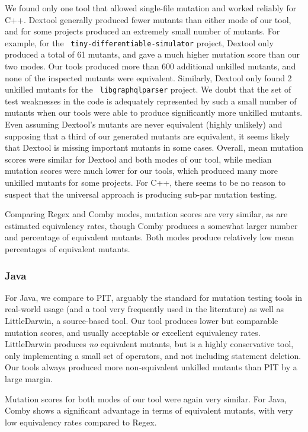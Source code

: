 \documentclass[sigconf,review, anonymous]{acmart}
\begin{document}
{We found only one tool that allowed single-file mutation and worked
reliably for C++.  Dextool generally produced fewer mutants than
either mode of our tool, and for some projects produced an extremely
small number of mutants.  For example, for the {\tt
  tiny-differentiable-simulator} project, Dextool only produced a
total of 61 mutants, and gave a much higher mutation score than our
two modes.  Our tools produced more than 600 additional unkilled
mutants, and none of the inspected mutants were equivalent.
Similarly, Dextool only found 2 unkilled mutants for the {\tt
  libgraphqlparser} project.  We doubt that the set of test weaknesses
in the code is adequately represented by such a small number of
mutants when our tools were able to produce significantly more
unkilled mutants.  Even assuming Dextool's mutants are never
equivalent (highly unlikely) and supposing that a third of our
generated mutants are equivalent, it seems likely that Dextool is
missing important mutants in some cases.  Overall, mean mutation
scores were similar for Dextool and both modes of our tool, while
median mutation scores were much lower for our tools, which produced
many more unkilled mutants for some projects.  For C++, there seems to
be no reason to suspect that the universal approach is producing
sub-par mutation testing.

Comparing Regex and Comby modes, mutation scores are very similar, as
are estimated equivalency rates, though Comby produces a somewhat
larger number and percentage of equivalent mutants.  Both modes
produce relatively low mean percentages of equivalent mutants.

\subsubsection{Java}

For Java, we compare to PIT, arguably the standard for mutation
testing tools in real-world usage (and a tool very frequently used in
the literature) as well as LittleDarwin, a source-based tool.  Our
tool produces lower but comparable mutation scores, and usually
acceptable or excellent equivalency rates.  LittleDarwin produces
\emph{no} equivalent mutants, but is a highly conservative tool, only
implementing a small set of operators, and not including statement
deletion.  Our tools always produced more non-equivalent unkilled
mutants than PIT by a large margin.

Mutation scores for both modes of our tool were again very similar.
For Java, Comby shows a significant advantage in terms of equivalent
mutants, with very low equivalency rates compared to Regex.

}
\end{document}
